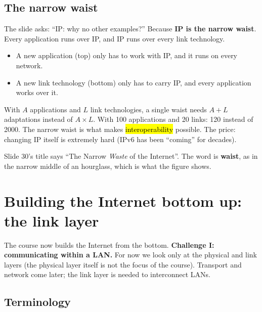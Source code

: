 \subsection{The narrow waist}


\begin{intuition}
The slide asks: ``IP: why no other examples?'' Because \textbf{IP is the narrow waist}. Every application runs over IP, and IP runs over every link technology.
\begin{itemize}
  \item A new application (top) only has to work with IP, and it runs on every network.
  \item A new link technology (bottom) only has to carry IP, and every application works over it.
\end{itemize}
With $A$ applications and $L$ link technologies, a single waist needs $A+L$ adaptations instead of $A\times L$. With 100 applications and 20 links: 120 instead of 2000.
The narrow waist is what makes \hl{interoperability} possible. The price: changing IP itself is extremely hard (IPv6 has been ``coming'' for decades).
\end{intuition}

\begin{pitfall}
Slide 30's title says ``The Narrow \emph{Waste} of the Internet''. The word is \textbf{waist}, as in the narrow middle of an hourglass, which is what the figure shows.
\end{pitfall}

\section{Building the Internet bottom up: the link layer}

The course now builds the Internet from the bottom. \textbf{Challenge I: communicating within a LAN.} For now we look only at the physical and link layers
(the physical layer itself is not the focus of the course). Transport and network come later; the link layer is needed to interconnect LANs.

\subsection{Terminology}

